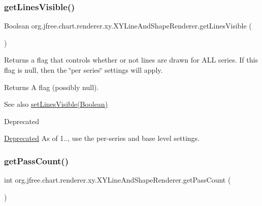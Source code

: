 \subsubsection{\texorpdfstring{get\+Lines\+Visible()}{getLinesVisible()}}
{\footnotesize\ttfamily Boolean org.\+jfree.\+chart.\+renderer.\+xy.\+X\+Y\+Line\+And\+Shape\+Renderer.\+get\+Lines\+Visible (\begin{DoxyParamCaption}{ }\end{DoxyParamCaption})}

Returns a flag that controls whether or not lines are drawn for A\+LL series. If this flag is {\ttfamily null}, then the \char`\"{}per series\char`\"{} settings will apply.

\begin{DoxyReturn}{Returns}
A flag (possibly {\ttfamily null}).
\end{DoxyReturn}
\begin{DoxySeeAlso}{See also}
\mbox{\hyperlink{classorg_1_1jfree_1_1chart_1_1renderer_1_1xy_1_1_x_y_line_and_shape_renderer_a806284dac4ab82c45330b32f2ce96961}{set\+Lines\+Visible(\+Boolean)}}
\end{DoxySeeAlso}
\begin{DoxyRefDesc}{Deprecated}
\item[\mbox{\hyperlink{deprecated__deprecated000242}{Deprecated}}]As of 1.., use the per-\/series and base level settings. \end{DoxyRefDesc}
\mbox{\label{classorg_1_1jfree_1_1chart_1_1renderer_1_1xy_1_1_x_y_line_and_shape_renderer_addd2389f670fbb87080789c616dfbb91}} 
\subsubsection{\texorpdfstring{get\+Pass\+Count()}{getPassCount()}}
{\footnotesize\ttfamily int org.\+jfree.\+chart.\+renderer.\+xy.\+X\+Y\+Line\+And\+Shape\+Renderer.\+get\+Pass\+Count (\begin{DoxyParamCaption}{ }\end{DoxyParamCaption})}

